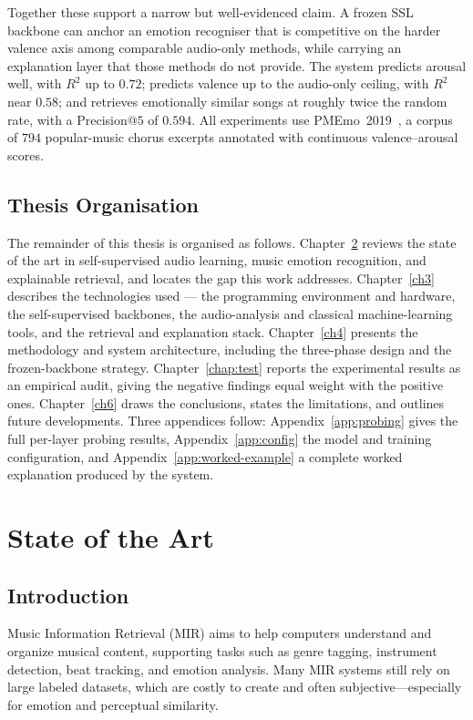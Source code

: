\documentclass[12pt]{report}
\begin{document}
Together these support a narrow but well-evidenced claim. A frozen SSL backbone can anchor an emotion recogniser that is competitive on the harder valence axis among comparable audio-only methods, while carrying an explanation layer that those methods do not provide. The system predicts arousal well, with $R^{2}$ up to $0.72$; predicts valence up to the audio-only ceiling, with $R^{2}$ near $0.58$; and retrieves emotionally similar songs at roughly twice the random rate, with a Precision@$5$ of $0.594$. All experiments use PMEmo~2019~\cite{zhang_pmemo_2018}, a corpus of $794$ popular-music chorus excerpts annotated with continuous valence--arousal scores.

\section{Thesis Organisation}

The remainder of this thesis is organised as follows. Chapter~\ref{chap:state_of_the_art} reviews the state of the art in self-supervised audio learning, music emotion recognition, and explainable retrieval, and locates the gap this work addresses. Chapter~\ref{ch3} describes the technologies used --- the programming environment and hardware, the self-supervised backbones, the audio-analysis and classical machine-learning tools, and the retrieval and explanation stack. Chapter~\ref{ch4} presents the methodology and system architecture, including the three-phase design and the frozen-backbone strategy. Chapter~\ref{chap:test} reports the experimental results as an empirical audit, giving the negative findings equal weight with the positive ones. Chapter~\ref{ch6} draws the conclusions, states the limitations, and outlines future developments. Three appendices follow: Appendix~\ref{app:probing} gives the full per-layer probing results, Appendix~\ref{app:config} the model and training configuration, and Appendix~\ref{app:worked-example} a complete worked explanation produced by the system.
% 
% 

\chapter{State of the Art}
\label{chap:state_of_the_art}

\section{Introduction}
Music Information Retrieval (MIR) aims to help computers understand and organize musical content, supporting tasks such as genre tagging, instrument detection, beat tracking, and emotion analysis. Many MIR systems still rely on large labeled datasets, which are costly to create and often subjective—especially for emotion and perceptual similarity.
\end{document}
